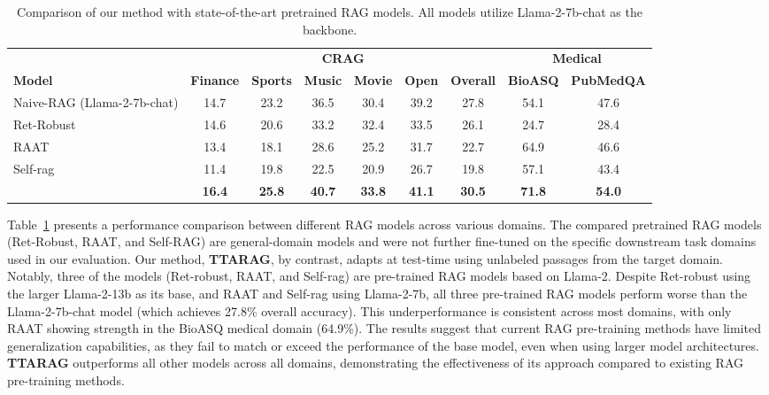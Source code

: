 \documentclass{article}
\newcommand{\ourmethod}{{\fontfamily{lmtt}\selectfont \textbf{TTARAG}}\xspace}
\begin{document}
\begin{table}[t]
    \centering
    \caption{Comparison of our method with state-of-the-art pretrained RAG models. All models utilize Llama-2-7b-chat as the backbone.}
    \label{tab:results_llama2}
    \begin{tabular}{l@{\hspace{8pt}}cccccccc}
    \toprule
    & \multicolumn{6}{c}{\textbf{CRAG}} & \multicolumn{2}{c}{\textbf{Medical}} \\
    \cmidrule(lr){2-7} \cmidrule(l){8-9}
    \textbf{Model} & \textbf{Finance} & \textbf{Sports} & \textbf{Music} & \textbf{Movie} & \textbf{Open} & \textbf{Overall} & \textbf{BioASQ} & \textbf{PubMedQA} \\
    \midrule
    Naive-RAG (Llama-2-7b-chat) & 14.7 & 23.2 & 36.5 & 30.4 & 39.2 & 27.8 & 54.1 & 47.6 \\
    \midrule
    Ret-Robust & 14.6 & 20.6 & 33.2 & 32.4 & 33.5 & 26.1 & 24.7 & 28.4 \\
    RAAT & 13.4 & 18.1 & 28.6 & 25.2 & 31.7 & 22.7 & 64.9 & 46.6 \\
    Self-rag & 11.4 & 19.8 & 22.5 & 20.9 & 26.7 & 19.8 & 57.1 & 43.4 \\
    \midrule
    \rowcolor{gray!20}\ourmethod & \textbf{16.4} & \textbf{25.8} & \textbf{40.7} & \textbf{33.8} & \textbf{41.1} & \textbf{30.5} & \textbf{71.8} & \textbf{54.0} \\
    \bottomrule
    \end{tabular}
    \end{table}

Table~\ref{tab:results_llama2} presents a performance comparison between different RAG models across various domains. The compared pretrained RAG models (Ret-Robust, RAAT, and Self-RAG) are general-domain models and were not further fine-tuned on the specific downstream task domains used in our evaluation. Our method, \ourmethod, by contrast, adapts at test-time using unlabeled passages from the target domain. Notably, three of the models (Ret-robust, RAAT, and Self-rag) are pre-trained RAG models based on Llama-2. Despite Ret-robust using the larger Llama-2-13b as its base, and RAAT and Self-rag using Llama-2-7b, all three pre-trained RAG models perform worse than the Llama-2-7b-chat model (which achieves 27.8\% overall accuracy). This underperformance is consistent across most domains, with only RAAT showing strength in the BioASQ medical domain (64.9\%). The results suggest that current RAG pre-training methods have limited generalization capabilities, as they fail to match or exceed the performance of the base model, even when using larger model architectures. \ourmethod outperforms all other models across all domains, demonstrating the effectiveness of its approach compared to existing RAG pre-training methods.
\end{document}
